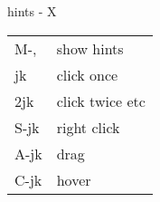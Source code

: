 \begin{conceptbox}[white]{hints - X}
\begin{tabular}{ll}
M-,&show hints\\
jk&click once\\
2jk&click twice etc\\
S-jk&right click\\
A-jk&drag\\
C-jk&hover\\
\end{tabular}
\end{conceptbox}
